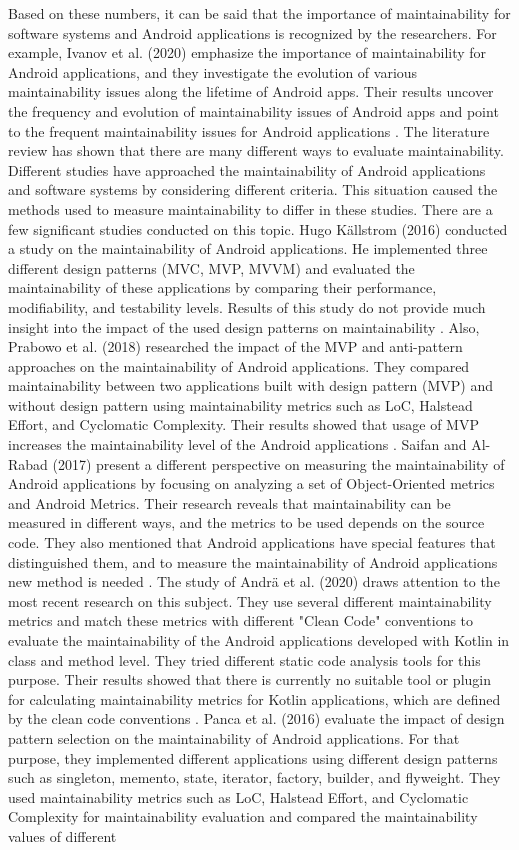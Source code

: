 Based on these numbers, it can be said that the importance of maintainability for software systems and Android applications is recognized by the researchers. For example, Ivanov et al. (2020) emphasize the importance of maintainability for Android applications, and they investigate the evolution of various maintainability issues along the lifetime of Android apps. Their results uncover the frequency and evolution of maintainability issues of Android apps and point to the frequent maintainability issues for Android applications \cite{53}. The literature review has shown that there are many different ways to evaluate maintainability. Different studies have approached the maintainability of Android applications and software systems by considering different criteria. This situation caused the methods used to measure maintainability to differ in these studies. There are a few significant studies conducted on this topic. Hugo Källstrom (2016) conducted a study on the maintainability of Android applications. He implemented three different design patterns (MVC, MVP, MVVM) and evaluated the maintainability of these applications by comparing their performance, modifiability, and testability levels. Results of this study do not provide much insight into the impact of the used design patterns on maintainability \cite{18}. Also, Prabowo et al. (2018) researched the impact of the MVP and anti-pattern approaches on the maintainability of Android applications. They compared maintainability between two applications built with design pattern (MVP) and without design pattern using maintainability metrics such as LoC, Halstead Effort, and Cyclomatic Complexity. Their results showed that usage of MVP increases the maintainability level of the Android applications \cite{19}. Saifan and Al-Rabad (2017) present a different perspective on measuring the maintainability of Android applications by focusing on analyzing a set of Object-Oriented metrics and Android Metrics. Their research reveals that maintainability can be measured in different ways, and the metrics to be used depends on the source code.  They also mentioned that Android applications have special features that distinguished them, and to measure the maintainability of Android applications new method is needed \cite{34}. The study of Andrä et al. (2020) draws attention to the most recent research on this subject. They use several different maintainability metrics and match these metrics with different "Clean Code" conventions to evaluate the maintainability of the Android applications developed with Kotlin in class and method level. They tried different static code analysis tools for this purpose. Their results showed that there is currently no suitable tool or plugin for calculating maintainability metrics for Kotlin applications, which are defined by the clean code conventions \cite{43}. Panca et al. (2016) evaluate the impact of design pattern selection on the maintainability of Android applications. For that purpose, they implemented different applications using different design patterns such as singleton, memento, state, iterator, factory, builder, and flyweight. They used maintainability metrics such as LoC, Halstead Effort, and Cyclomatic Complexity for maintainability evaluation and compared the maintainability values of different 